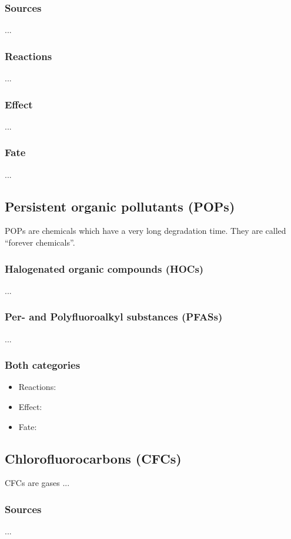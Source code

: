 \documentclass{article}
\begin{document}
\subsubsection{Sources}
...

\subsubsection{Reactions}
...

\subsubsection{Effect}
...

\subsubsection{Fate}
... 

\subsection{Persistent organic pollutants (POPs)}
POPs are chemicals which have a very long degradation time. They are called
``forever chemicals''.

\subsubsection{Halogenated organic compounds (HOCs)}
...

\subsubsection{Per- and Polyfluoroalkyl substances (PFASs)}
...

\subsubsection{Both categories}
\begin{itemize}
    \item Reactions:
    \item Effect:
    \item Fate:
\end{itemize}

\subsection{Chlorofluorocarbons (CFCs)}
CFCs are gases ...

\subsubsection{Sources}
...
\end{document}
